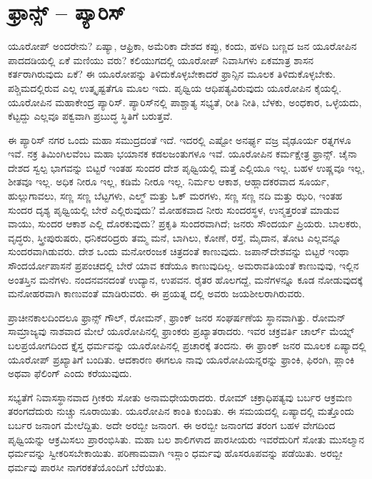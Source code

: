 \section{ಫ್ರಾನ್ಸ್ – ಪ್ಯಾರಿಸ್}

ಯೂರೋಪ್​ ಅಂದರೇನು? ಏಷ್ಯಾ, ಆಫ್ರಿಕಾ, ಅಮೆರಿಕಾ ದೇಶದ ಕಪ್ಪು, ಕಂದು, ಹಳದಿ ಬಣ್ಣದ ಜನ ಯೂರೋಪಿನ ಪಾದದಡಿಯಲ್ಲಿ ಏಕೆ ಮಣಿಯು ವರು? ಕಲಿಯುಗದಲ್ಲಿ ಯೂರೋಪ್​ ನಿವಾಸಿಗಳು ಏಕಮಾತ್ರ ಶಾಸನ ಕರ್ತರಾಗಿರುವುದು ಏಕೆ? ಈ ಯೂರೋಪನ್ನು ತಿಳಿದುಕೊಳ್ಳಬೇಕಾದರೆ ಫ್ರಾನ್ಸಿನ ಮೂಲಕ ತಿಳಿದುಕೊಳ್ಳಬೇಕು. ಪಶ್ಚಿಮದಲ್ಲಿರುವ ಎಲ್ಲ ಉತ್ಕೃಷ್ಟತೆಗೂ ಮೂಲ ಇದು. ಪೃಥ್ವಿಯ ಆಧಿಪತ್ಯವಿರುವುದು ಯೂರೋಪಿನ ಕೈಯಲ್ಲಿ. ಯೂರೋಪಿನ ಮಹಾಕೇಂದ್ರ ಪ್ಯಾರಿಸ್​. ಪ್ಯಾರಿಸ್​ನಲ್ಲಿ ಪಾಶ್ಚಾತ್ಯ ಸಭ್ಯತೆ, ರೀತಿ ನೀತಿ, ಬೆಳಕು, ಅಂಧಕಾರ, ಒಳ್ಳೆಯದು, ಕೆಟ್ಟದ್ದು ಎಲ್ಲವೂ ಪಕ್ವವಾಗಿ ಪ್ರಬುದ್ಧ ಸ್ಥಿತಿಗೆ ಬರುತ್ತವೆ.

ಈ ಪ್ಯಾರಿಸ್​ ನಗರ ಒಂದು ಮಹಾ ಸಮುದ್ರದಂತೆ ಇದೆ. ಇದರಲ್ಲಿ ಎಷ್ಟೋ ಅನರ್ಘ್ಯ ವಜ್ರ ವೈಢೂರ್ಯ ರತ್ನಗಳೂ ಇವೆ. ನಕ್ರ ತಿಮಿಂಗಿಲವೆಂಬ ಮಹಾ ಭಯಾನಕ ಕಡಲಜಂತುಗಳೂ ಇವೆ. ಯೂರೋಪಿನ ಕರ್ಮಕ್ಷೇತ್ರ ಫ್ರಾನ್ಸ್​. ಚೈನಾ ದೇಶದ ಸ್ವಲ್ಪ ಭಾಗವನ್ನು ಬಿಟ್ಟರೆ ಇಂತಹ ಸುಂದರ ದೇಶ ಪೃಥ್ವಿಯಲ್ಲಿ ಮತ್ತೆ ಎಲ್ಲಿಯೂ ಇಲ್ಲ. ಬಹಳ ಉಷ್ಣವೂ ಇಲ್ಲ, ಶೀತವೂ ಇಲ್ಲ. ಅಧಿಕ ನೀರೂ ಇಲ್ಲ, ಕಡಿಮೆ ನೀರೂ ಇಲ್ಲ. ನಿರ್ಮಲ ಆಕಾಶ, ಆಹ್ಲಾದಕರವಾದ ಸೂರ್ಯ, ಹುಲ್ಲುಗಾವಲು, ಸಣ್ಣ ಸಣ್ಣ ಬೆಟ್ಟಗಳು, ಎಲ್ಮ್​ ಮತ್ತು ಓಕ್​ ಮರಗಳು, ಸಣ್ಣ ಸಣ್ಣ ನದಿ ಮತ್ತು ಝರಿ, ಇಂತಹ ಸುಂದರ ದೃಶ್ಯ ಪೃಥ್ವಿಯಲ್ಲಿ ಬೇರೆ ಎಲ್ಲಿರುವುದು? ಮೋಹಕವಾದ ನೀರು ಸುಂದರಸ್ಥಳ, ಉನ್ಮತ್ತರಂತೆ ಮಾಡುವ ವಾಯು, ಸುಂದರ ಆಕಾಶ ಎಲ್ಲಿ ದೊರಕುವುದು? ಪ್ರಕೃತಿ ಸುಂದರವಾಗಿದೆ; ಜನರು ಸೌಂದರ್ಯ ಪ್ರಿಯರು. ಬಾಲಕರು, ವೃದ್ಧರು, ಸ್ತ್ರೀಪುರುಷರು, ಧನಿಕದರಿದ್ರರು ತಮ್ಮ ಮನೆ, ಬಾಗಿಲು, ಕೋಣೆ, ರಸ್ತೆ, ಮೈದಾನ, ತೋಟ ಎಲ್ಲವನ್ನೂ ಸುಂದರವಾಗಿಡುವರು. ದೇಶ ಒಂದು ಮನೋರಂಜಕ ಚಿತ್ರದಂತೆ ಕಾಣುವುದು. ಜಪಾನ್​ ದೇಶವನ್ನು ಬಿಟ್ಟರೆ ಇಂಥಾ ಸೌಂದರ್ಯೋಪಾಸನೆ ಪ್ರಪಂಚದಲ್ಲಿ ಬೇರೆ ಯಾವ ಕಡೆಯೂ ಕಾಣುವುದಿಲ್ಲ. ಅಮರಾವತಿಯಂತೆ ಕಾಣುವುವು, ಇಲ್ಲಿನ ಅಂತಸ್ತಿನ ಮನೆಗಳು. ನಂದನವನದಂತೆ ಉದ್ಯಾನ, ಉಪವನ. ರೈತರ ಹೊಲಗದ್ದೆ, ಮನೆಗಳನ್ನೂ ಕೂಡ ನೋಡುವುದಕ್ಕೆ ಮನೋಹರವಾಗಿ ಕಾಣುವಂತೆ ಮಾಡಿರುವರು. ಈ ಪ್ರಯತ್ನ ದಲ್ಲಿ ಅವರು ಜಯಶೀಲರಾಗಿರುವರು.

ಪ್ರಾಚೀನಕಾಲದಿಂದಲೂ ಫ್ರಾನ್ಸ್​ ಗೌಲ್​, ರೋಮನ್​, ಫ್ರಾಂಕ್​ ಜನರ ಸಂಘರ್ಷಣೆಯ ಸ್ಥಾನವಾಗಿತ್ತು. ರೋಮನ್​ ಸಾಮ್ರಾಜ್ಯವು ನಾಶವಾದ ಮೇಲೆ ಯೂರೋಪಿನಲ್ಲಿ ಫ್ರಾಂಕರು ಪ್ರಖ್ಯಾತರಾದರು. ಇವರ ಚಕ್ರವರ್ತಿ ಚಾರ್ಲ್​ ಮೆಯ್ನ್​ ಬಲಪ್ರಯೋಗದಿಂದ ಕ್ತೈಸ್ತ ಧರ್ಮವನ್ನು ಯೂರೋಪಿನಲ್ಲಿ ಪ್ರಚಾರಕ್ಕೆ ತಂದನು. ಈ ಫ್ರಾಂಕ್​ ಜನರ ಮೂಲಕ ಏಷ್ಯಾದಲ್ಲಿ ಯೂರೋಪ್​ ಪ್ರಖ್ಯಾತಿಗೆ ಬಂದಿತು. ಆದಕಾರಣ ಈಗಲೂ ನಾವು ಯೂರೋಪಿಯನ್ನರನ್ನು ಫ್ರಾಂಕಿ, ಫಿರಂಗಿ, ಪ್ಲಾಂಕಿ ಅಥವಾ ಫೆಲಿಂಗ್​ ಎಂದು ಕರೆಯುವುದು.

ಸಭ್ಯತೆಗೆ ನಿವಾಸಸ್ಥಾನವಾದ ಗ್ರೀಕರು ಸೋತು ಅನಾಮಧೇಯರಾದರು. ರೋಮ್​ ಚಕ್ರಾಧಿಪತ್ಯವು ಬರ್ಬರ ಆಕ್ರಮಣ ತರಂಗದೆದುರು ನುಚ್ಚು ನೂರಾಯಿತು. ಯೂರೋಪಿನ ಕಾಂತಿ ಕುಂದಿತು. ಈ ಸಮಯದಲ್ಲಿ ಏಷ್ಯಾದಲ್ಲಿ ಮತ್ತೊಂದು ಬರ್ಬರ ಜನಾಂಗ ಮೇಲೆದ್ದಿತು. ಅದೇ ಅರಬ್ಬೀ ಜನಾಂಗ. ಈ ಅರಬ್ಬೀ ಜನಾಂಗದ ತರಂಗ ಬಹಳ ವೇಗದಿಂದ ಪೃಥ್ವಿಯನ್ನು ಆಕ್ರಮಿಸಲು ಪ್ರಾರಂಭಿಸಿತು. ಮಹಾ ಬಲ ಶಾಲಿಗಳಾದ ಪಾರಸೀಯರು ಇವರೆದುರಿಗೆ ಸೋತು ಮುಸಲ್ಮಾನ ಧರ್ಮವನ್ನು ಸ್ವೀಕರಿಸಬೇಕಾಯಿತು. ಪರಿಣಾಮವಾಗಿ ಇಸ್ಲಾಂ ಧರ್ಮವು ಹೊಸರೂಪವನ್ನು ಪಡೆಯಿತು. ಅರಬ್ಬೀ ಧರ್ಮವು ಪಾರಸೀ ನಾಗರಕತೆಯೊಂದಿಗೆ ಬೆರೆಯಿತು.

